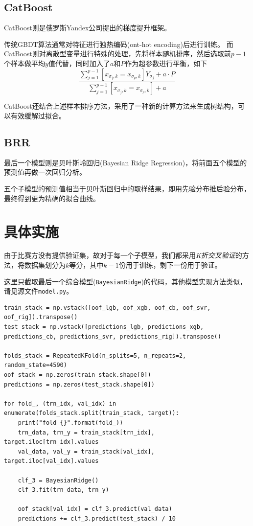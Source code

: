 \documentclass[logo,reportComp]{thesis}
\begin{document}
\subsection{CatBoost}
CatBoost则是俄罗斯Yandex公司提出的梯度提升框架。

传统GBDT算法通常对特征进行独热编码(ont-hot encoding)后进行训练。
而CatBoost则对离散型变量进行特殊的处理，先将样本随机排序，然后选取前$p-1$个样本做平均$y$值代替，同时加入了$a$和$P$作为超参数进行平衡，如下
\[\frac{\sum_{j=1}^{p-1}[x_{\sigma_j,k}=x_{\sigma_p,k}]Y_{\sigma_j}+a\cdot P}{\sum_{j=1}^{p-1}[x_{\sigma_j,k}=x_{\sigma_p,k}]+a}\]

CatBoost还结合上述样本排序方法，采用了一种新的计算方法来生成树结构，可以有效缓解过拟合。


\subsection{BRR}
最后一个模型则是贝叶斯岭回归(Bayesian Ridge Regression)，将前面五个模型的预测值再做一次回归分析。

五个子模型的预测值相当于贝叶斯回归中的取样结果，即用先验分布推后验分布，最终得到更为精确的拟合曲线。


\section{具体实施}
由于比赛方没有提供验证集，故对于每一个子模型，我们都采用\emph{K折交叉验证}的方法，将数据集划分为$k$等分，其中$k-1$份用于训练，剩下一份用于验证。

这里只截取最后一个综合模型(\verb'BayesianRidge')的代码，其他模型实现方法类似，请见源文件\verb'model.py'。
\begin{lstlisting}
train_stack = np.vstack([oof_lgb, oof_xgb, oof_cb, oof_svr, oof_rig]).transpose()
test_stack = np.vstack([predictions_lgb, predictions_xgb, predictions_cb, predictions_svr, predictions_rig]).transpose()

folds_stack = RepeatedKFold(n_splits=5, n_repeats=2, random_state=4590)
oof_stack = np.zeros(train_stack.shape[0])
predictions = np.zeros(test_stack.shape[0])

for fold_, (trn_idx, val_idx) in enumerate(folds_stack.split(train_stack, target)):
    print("fold {}".format(fold_))
    trn_data, trn_y = train_stack[trn_idx], target.iloc[trn_idx].values
    val_data, val_y = train_stack[val_idx], target.iloc[val_idx].values

    clf_3 = BayesianRidge()
    clf_3.fit(trn_data, trn_y)

    oof_stack[val_idx] = clf_3.predict(val_data)
    predictions += clf_3.predict(test_stack) / 10
\end{lstlisting}
\end{document}
